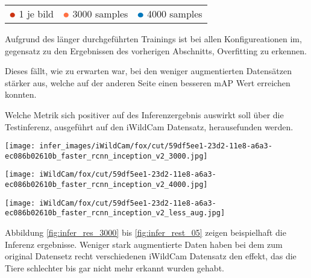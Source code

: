 \begin{table}[htb]
  \centering
  \begin{tabular}{m{}<{\centering}m{}<{\centering}m{}<{\centering}}
    $\color[HTML]{CC3311}\medbullet$  1 je bild & $\color[HTML]{FF7043}\medbullet$  3000 samples & $\color[HTML]{0077BB}\medbullet$  4000 samples
  \end{tabular}    
\end{table}

Aufgrund des länger durchgeführten Trainings ist bei allen Konfigureationen
im, gegensatz zu den Ergebnissen des vorherigen Abschnitts, Overfitting 
zu erkennen.

Dieses fällt, wie zu erwarten war, bei den weniger  
augmentierten Datensätzen stärker aus, welche auf der 
anderen Seite einen besseren mAP Wert erreichen konnten.

Welche Metrik sich positiver auf des Inferenzergebnis auswirkt 
soll über die Testinferenz, ausgeführt 
auf den iWildCam Datensatz, herausefunden werden.


\vspace{1cm}
\begin{minipage}{0.333\textwidth}
  \centering
  \texttt{[image: infer\_images/iWildCam/fox/cut/59df5ee1-23d2-11e8-a6a3-ec086b02610b\_faster\_rcnn\_inception\_v2\_3000.jpg]}
  \label{fig:infer_res_3000}
\end{minipage}
\begin{minipage}{0.333\textwidth}
  \centering
  \label{fig:infer_res_4000}
  \texttt{[image: iWildCam/fox/cut/59df5ee1-23d2-11e8-a6a3-ec086b02610b\_faster\_rcnn\_inception\_v2\_4000.jpg]}
\end{minipage}
\begin{minipage}{0.333\textwidth}
  \centering
  \texttt{[image: iWildCam/fox/cut/59df5ee1-23d2-11e8-a6a3-ec086b02610b\_faster\_rcnn\_inception\_v2\_less\_aug.jpg]}
  \label{fig:infer_rest_05}
\end{minipage}
\vspace{1cm}

Abbildung \ref{fig:infer_res_3000} bis \ref{fig:infer_rest_05}
zeigen beispielhaft die Inferenz ergebnisse.
Weniger stark augmentierte Daten haben bei dem zum original 
Datensetz recht verschiedenen iWildCam Datensatz den effekt, 
das die Tiere schlechter bis gar nicht mehr erkannt wurden gehabt.



